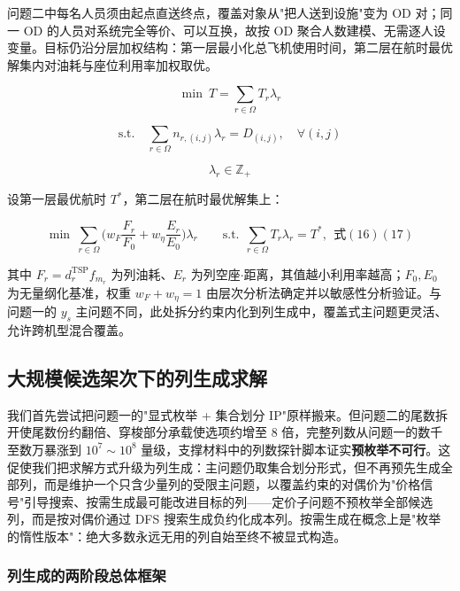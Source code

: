 \documentclass[zihao=-4,a4paper]{ctexart}
\begin{document}
问题二中每名人员须由起点直送终点，覆盖对象从"把人送到设施"变为 OD 对；同一 OD 的人员对系统完全等价、可以互换，故按 OD 聚合人数建模、无需逐人设变量。目标仍沿分层加权结构：第一层最小化总飞机使用时间，第二层在航时最优解集内对油耗与座位利用率加权取优。

\begin{equation}
  \min\ T=\sum_{r\in\Omega} T_r\lambda_r
\end{equation}

\begin{equation}
  \text{s.t.}\quad \sum_{r\in\Omega} n_{r,(i,j)}\lambda_r=D_{(i,j)},\quad\forall(i,j)
\end{equation}

\begin{equation}
  \lambda_r\in\mathbb{Z}_+
\end{equation}

设第一层最优航时 $T^*$，第二层在航时最优解集上：

\begin{equation}
  \min\ \sum_{r\in\Omega}\Big(w_F\frac{F_r}{F_0}+w_\eta\frac{E_r}{E_0}\Big)\lambda_r
  \qquad\text{s.t.}\ \ \sum_{r\in\Omega}T_r\lambda_r=T^*,\ \ \text{式}(16)(17)
\end{equation}

其中 $F_r=d_r^{\text{TSP}}f_{m_r}$ 为列油耗、$E_r$ 为列空座$\cdot$距离，其值越小利用率越高；$F_0,E_0$ 为无量纲化基准，权重 $w_F+w_\eta=1$ 由层次分析法确定并以敏感性分析验证。与问题一的 $y_s$ 主问题不同，此处拆分约束内化到列生成中，覆盖式主问题更灵活、允许跨机型混合覆盖。

\subsection{大规模候选架次下的列生成求解}

我们首先尝试把问题一的"显式枚举 + 集合划分 IP"原样搬来。但问题二的尾数拆开使尾数份约翻倍、穿梭部分承载使选项约增至 8 倍，完整列数从问题一的数千至数万暴涨到 $10^7\sim10^8$ 量级，支撑材料中的列数探针脚本证实\textbf{预枚举不可行}。这促使我们把求解方式升级为列生成：主问题仍取集合划分形式，但不再预先生成全部列，而是维护一个只含少量列的受限主问题，以覆盖约束的对偶价为"价格信号"引导搜索、按需生成最可能改进目标的列——定价子问题不预枚举全部候选列，而是按对偶价通过 DFS 搜索生成负约化成本列。按需生成在概念上是"枚举的惰性版本"：绝大多数永远无用的列自始至终不被显式构造。

\subsubsection{列生成的两阶段总体框架}
\end{document}
